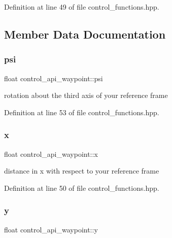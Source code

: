 Definition at line 49 of file control\+\_\+functions.\+hpp.



\subsection{Member Data Documentation}
\mbox{\label{structcontrol__api__waypoint_a053fed6c42cdeda2029d2db548f357b4}} 
\subsubsection{\texorpdfstring{psi}{psi}}
{\footnotesize\ttfamily float control\+\_\+api\+\_\+waypoint\+::psi}



rotation about the third axis of your reference frame 



Definition at line 53 of file control\+\_\+functions.\+hpp.

\mbox{\label{structcontrol__api__waypoint_a381813ee0649f54116dec8d8ed78b26e}} 
\subsubsection{\texorpdfstring{x}{x}}
{\footnotesize\ttfamily float control\+\_\+api\+\_\+waypoint\+::x}



distance in x with respect to your reference frame 



Definition at line 50 of file control\+\_\+functions.\+hpp.

\mbox{\label{structcontrol__api__waypoint_ac92d8860930259ccb19aa91072d94546}} 
\subsubsection{\texorpdfstring{y}{y}}
{\footnotesize\ttfamily float control\+\_\+api\+\_\+waypoint\+::y}



